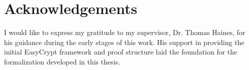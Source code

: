 \chapter*{Acknowledgements}

I would like to express my gratitude to my supervisor, Dr. Thomas Haines, for his guidance during the early stages of this work. His support in providing the initial EasyCrypt framework and proof structure laid the foundation for the formalization developed in this thesis.